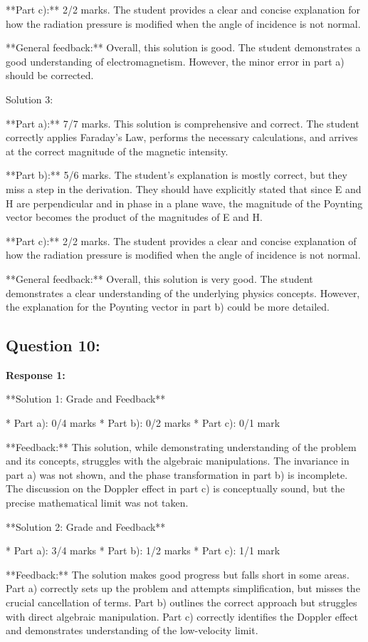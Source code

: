 \documentclass[a4paper,11pt]{article}
\begin{document}
**Part c):** 2/2 marks. The student provides a clear and concise explanation for how the radiation pressure is modified when the angle of incidence is not normal.

**General feedback:** Overall, this solution is good. The student demonstrates a good understanding of electromagnetism. However, the minor error in part a) should be corrected.

Solution 3:

**Part a):** 7/7 marks. This solution is comprehensive and correct. The student correctly applies Faraday's Law, performs the necessary calculations, and arrives at the correct magnitude of the magnetic intensity. 

**Part b):** 5/6 marks. The student's explanation is mostly correct, but they miss a step in the derivation. They should have explicitly stated that since E and H are perpendicular and in phase in a plane wave, the magnitude of the Poynting vector becomes the product of the magnitudes of E and H.

**Part c):** 2/2 marks. The student provides a clear and concise explanation of how the radiation pressure is modified when the angle of incidence is not normal. 

**General feedback:** Overall, this solution is very good. The student demonstrates a clear understanding of the underlying physics concepts. However, the explanation for the Poynting vector in part b) could be more detailed.

\subsection*{Question 10:}

\textbf{Response 1:}

**Solution 1: Grade and Feedback**

* Part a): 0/4 marks
* Part b): 0/2 marks
* Part c): 0/1 mark

**Feedback:** This solution, while demonstrating understanding of the problem and its concepts, struggles with the algebraic manipulations. The invariance in part a) was not shown, and the phase transformation in part b) is incomplete. The discussion on the Doppler effect in part c) is conceptually sound, but the precise mathematical limit was not taken.

**Solution 2: Grade and Feedback**

* Part a): 3/4 marks
* Part b): 1/2 marks
* Part c): 1/1 mark

**Feedback:** The solution makes good progress but falls short in some areas. Part a) correctly sets up the problem and attempts simplification, but misses the crucial cancellation of terms. Part b) outlines the correct approach but struggles with direct algebraic manipulation. Part c) correctly identifies the Doppler effect and demonstrates understanding of the low-velocity limit.
\end{document}
